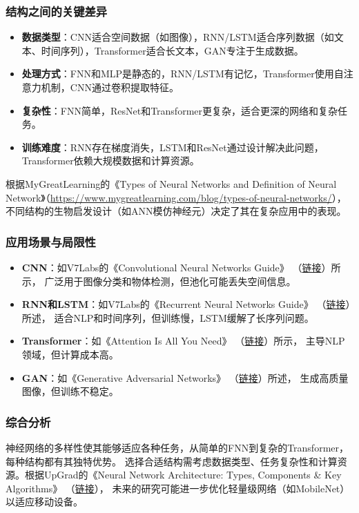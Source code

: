 \documentclass[UTF8]{report}
\theoremstyle{MyLineTheoremStyle} %
\theoremstyle{MyBlockTheoremStyle} %
\theoremstyle{MySubsubsectionStyle} %
\begin{document}
\subsubsection{结构之间的关键差异}
\begin{itemize}
    \item \textbf{数据类型}：CNN适合空间数据（如图像），RNN/LSTM适合序列数据（如文本、时间序列），Transformer适合长文本，GAN专注于生成数据。
    \item \textbf{处理方式}：FNN和MLP是静态的，RNN/LSTM有记忆，Transformer使用自注意力机制，CNN通过卷积提取特征。
    \item \textbf{复杂性}：FNN简单，ResNet和Transformer更复杂，适合更深的网络和复杂任务。
    \item \textbf{训练难度}：RNN存在梯度消失，LSTM和ResNet通过设计解决此问题，Transformer依赖大规模数据和计算资源。
\end{itemize}

根据MyGreatLearning的《Types of Neural Networks and Definition of Neural Network》（\url{https://www.mygreatlearning.com/blog/types-of-neural-networks/}），不同结构的生物启发设计（如ANN模仿神经元）决定了其在复杂应用中的表现。

\subsubsection{应用场景与局限性}
\begin{itemize}
    \item \textbf{CNN}：如V7Labs的《Convolutional Neural Networks Guide》
          （\href{https://www.v7labs.com/blog/convolutional-neural-networks-guide/}{链接}）所示，
          广泛用于图像分类和物体检测，但池化可能丢失空间信息。
    \item \textbf{RNN和LSTM}：如V7Labs的《Recurrent Neural Networks Guide》
          （\href{https://www.v7labs.com/blog/recurrent-neural-networks-guide/}{链接}）所述，
          适合NLP和时间序列，但训练慢，LSTM缓解了长序列问题。
    \item \textbf{Transformer}：如《Attention Is All You Need》
          （\href{https://arxiv.org/abs/1706.03762}{链接}）所示，
          主导NLP领域，但计算成本高。
    \item \textbf{GAN}：如《Generative Adversarial Networks》
          （\href{https://papers.nips.cc/paper/5423-generative-adversarial-nets.pdf}{链接}）所述，
          生成高质量图像，但训练不稳定。
\end{itemize}

\subsubsection{综合分析}
神经网络的多样性使其能够适应各种任务，从简单的FNN到复杂的Transformer，每种结构都有其独特优势。
选择合适结构需考虑数据类型、任务复杂性和计算资源。根据UpGrad的《Neural Network Architecture: 
Types, Components \& Key Algorithms》
（\href{https://www.upgrad.com/blog/neural-network-architecture-components-algorithms/}{链接}），
未来的研究可能进一步优化轻量级网络（如MobileNet）以适应移动设备。
\end{document}
